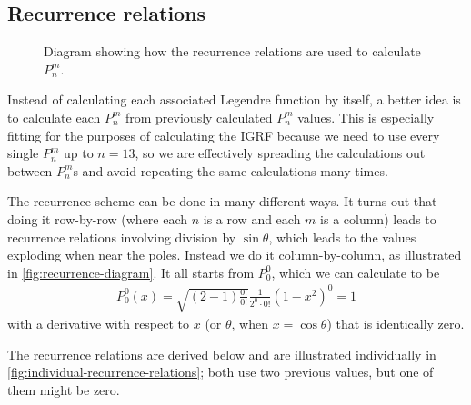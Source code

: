 \documentclass[12pt]{article}
\begin{document}
\subsection{Recurrence relations}
\begin{figure}[htbp]
  \centering
  \caption{Diagram showing how the recurrence relations are used to calculate $P_n^m$.}
  \label{fig:recurrence-diagram}
\end{figure}

Instead of calculating each associated Legendre function by itself, a better idea is to calculate each $P_n^m$ from previously calculated $P_n^m$ values. This is especially fitting for the purposes of calculating the IGRF because we need to use every single $P_n^m$ up to $n=13$, so we are effectively spreading the calculations out between $P_n^m$s and avoid repeating the same calculations many times. 

The recurrence scheme can be done in many different ways. It turns out that doing it row-by-row (where each $n$ is a row and each $m$ is a column) leads to recurrence relations involving division by $\sin\theta$, which leads to the values exploding when near the poles. Instead we do it column-by-column, as illustrated in \autoref{fig:recurrence-diagram}. It all starts from $P_0^0$, which we can calculate to be 
\begin{align}
  P_0^0(x) = \sqrt{(2 - 1)\frac{0!}{0!}}\frac{1}{2^0\cdot 0!}(1 - x^2)^0 = 1
\end{align}
with a derivative with respect to $x$ (or $\theta$, when $x=\cos\theta$) that is identically zero.

The recurrence relations are derived below and are illustrated individually in \autoref{fig:individual-recurrence-relations}; both use two previous values, but one of them might be zero.
\end{document}
